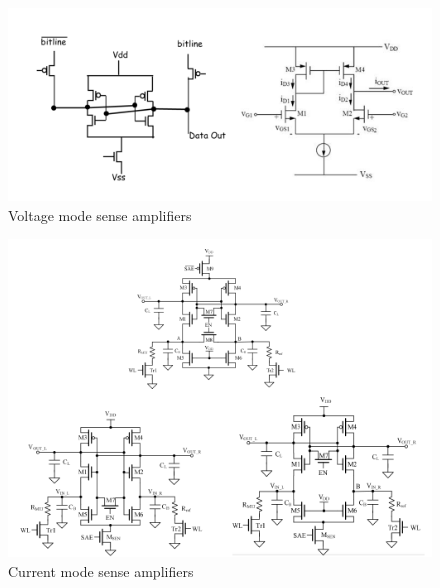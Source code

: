 \begin{figure}
  \centering
  \includegraphics[width=\textwidth]{../fig/hfdstk-sensamp-voltagemode.png}
  \caption{Voltage mode sense amplifiers}
  \label{fig:voltagemodesa}
\end{figure}
\begin{figure}
  \centering
  \includegraphics[width=\textwidth]{../fig/hfdstk-sensamp-currentmode.png}
  \caption{Current mode sense amplifiers\cite{5548588}}
  \label{fig:currentmodesa}
\end{figure}

